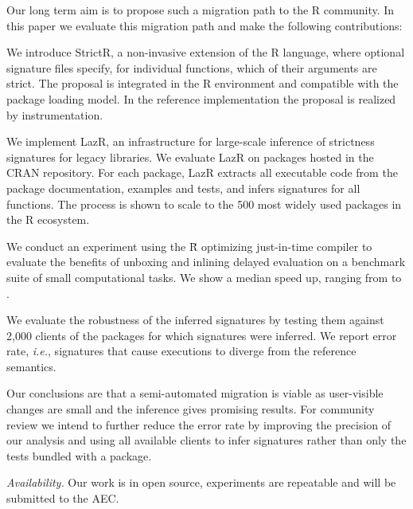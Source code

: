 \documentclass[review,nonacm,screen,acmsmall,anonymous=true]{acmart}
\newcommand{\strictr}{{\sf StrictR}\xspace}
\newcommand{\lazr}{{\sf LazR}\xspace}
\renewcommand{\Rsh}{{\sf\u R}\xspace}
\newcommand{\ie}{\emph{i.e.},\xspace}
\begin{document}
\medskip
\noindent Our long term aim is to propose such a migration path to the R community. In
this paper we evaluate this migration path and make the following contributions:
\vspace{1mm}

\begin{compactitem}[---]
\item We introduce \strictr, a non-invasive extension of the R language, where
  optional signature files specify, for individual functions, which of their
  arguments are strict. The proposal is integrated in the R environment and
  compatible with the package loading model. In the reference implementation the
  proposal is realized by instrumentation.
\item We implement \lazr, an infrastructure for large-scale inference of
  strictness signatures for legacy libraries. We evaluate \lazr on packages
  hosted in the CRAN repository. For each package, \lazr extracts all executable
  code from the package documentation, examples and tests, and infers signatures
  for all functions. The process is shown to scale to the 500 most widely used
  packages in the R ecosystem.
\item We conduct an experiment using the \Rsh optimizing just-in-time compiler
  to evaluate the benefits of unboxing and inlining delayed evaluation on a
  benchmark suite of small computational tasks. We show a median
  \speedupRshStrict speed up, ranging from \speedupRshStrictMin to
  \speedupRshStrictMax.
\item We evaluate the robustness of the inferred signatures by testing them
  against 2,000 clients of the packages for which signatures were inferred. We
  report \robustnesResult error rate, \ie signatures that cause executions to
  diverge from the reference semantics.

\end{compactitem}

\medskip

\noindent Our conclusions are that a semi-automated migration is viable as
user-visible changes are small and the inference gives promising results. For
community review we intend to further reduce the error rate by improving the
precision of our analysis and using all available clients to infer signatures
rather than only the tests bundled with a package.

{\small \medskip\noindent\emph{Availability.} Our work is in open source, experiments are
repeatable and will be submitted to the AEC.}
\end{document}
